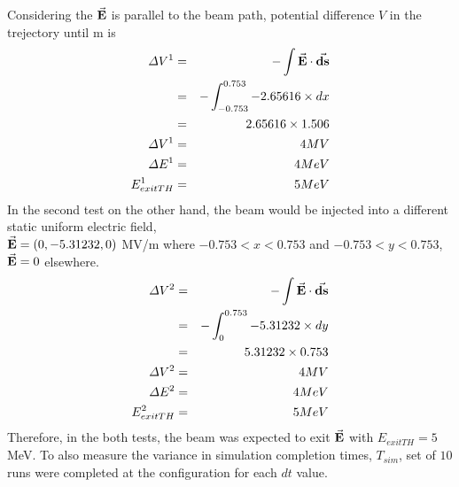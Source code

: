 \documentclass[a4paper,oneside,12pt]{report}
\numberwithin{equation}{chapter}
\begin{document}
Considering the $\vec{\textbf{E}}$ is parallel to the beam path, potential difference $V$ in the trejectory until m is
\begin{eqnarray}
    \Delta V^1 &=& - \int \vec{\textbf{E}} \cdot \vec{\textbf{ds}} \\
             &=& - \int_{-0.753}^{0.753} -2.65616 \times dx \\
             &=& 2.65616 \times 1.506 \\
    \Delta V^1 &=& 4 MV \\
    \Delta E^1 &=& 4 MeV \\
    E_{exitTH}^1 &=& 5 MeV
\end{eqnarray}
In the second test on the other hand, the beam would be injected into a different static uniform electric field, \\
$\vec{\textbf{E}}=(0, -5.31232, 0)$ MV/m where $-0.753<x<0.753$ and $-0.753<y<0.753$, $\vec{\textbf{E}}=0$ elsewhere.
\begin{eqnarray}
    \Delta V^2   &=& - \int \vec{\textbf{E}} \cdot \vec{\textbf{ds}} \\
                 &=& - \int_{0}^{0.753} -5.31232 \times dy \\
                 &=& 5.31232 \times 0.753 \\
    \Delta V^2   &=& 4 MV \\
    \Delta E^2   &=& 4 MeV \\
    E_{exitTH}^2 &=& 5 MeV
\end{eqnarray}
Therefore, in the both tests, the beam was expected to exit $\vec{\textbf{E}}$ with $E_{exitTH} = 5$ MeV. 
To also measure the variance in simulation completion times, $T_{sim}$, set of $10$ runs were completed at the configuration for each $dt$ value.
\end{document}
